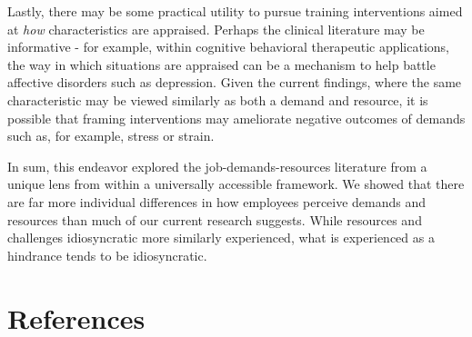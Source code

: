 \documentclass[
  man,mask]{apa7}
\begin{document}
Lastly, there may be some practical utility to pursue training interventions aimed at \emph{how} characteristics are appraised. Perhaps the clinical literature may be informative - for example, within cognitive behavioral therapeutic applications, the way in which situations are appraised can be a mechanism to help battle affective disorders such as depression. Given the current findings, where the same characteristic may be viewed similarly as both a demand and resource, it is possible that framing interventions may ameliorate negative outcomes of demands such as, for example, stress or strain.

In sum, this endeavor explored the job-demands-resources literature from a unique lens from within a universally accessible framework. We showed that there are far more individual differences in how employees perceive demands and resources than much of our current research suggests. While resources and challenges idiosyncratic more similarly experienced, what is experienced as a hindrance tends to be idiosyncratic.

\hypertarget{references}{%
\section{References}\label{references}}

\begingroup
\setlength{\parindent}{-0.5in}
\setlength{\leftskip}{0.5in}
\end{document}
